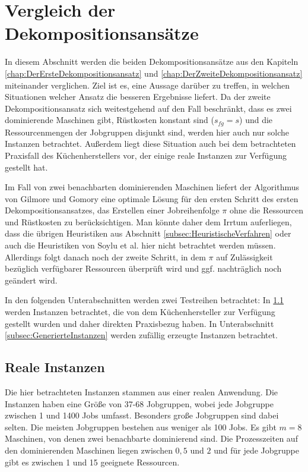 \documentclass{scrreprt}
\begin{document}
\section{Vergleich der Dekompositionsansätze}
\label{sec:VergleichDerDekompositionsansaetze} 
In diesem Abschnitt werden die beiden Dekompositionsansätze aus den Kapiteln \ref{chap:DerErsteDekompositionsansatz} und \ref{chap:DerZweiteDekompositionsansatz}
miteinander verglichen. Ziel ist es, eine Aussage darüber zu treffen, in welchen Situationen welcher Ansatz die besseren Ergebnisse liefert.
Da der zweite Dekompositionsansatz sich weitestgehend auf den Fall beschränkt, dass es zwei dominierende Maschinen gibt,
Rüstkosten konstant sind ($s_{fg}=s$) und die Ressourcenmengen der Jobgruppen disjunkt sind, werden hier auch nur solche Instanzen betrachtet.
Außerdem liegt diese Situation auch bei dem betrachteten Praxisfall des Küchenherstellers vor, der einige reale Instanzen zur Verfügung gestellt hat.

Im Fall von zwei benachbarten dominierenden Maschinen liefert der Algorithmus von Gilmore und Gomory eine optimale Lösung für den ersten Schritt des ersten
Dekompositionsansatzes, das Erstellen einer Jobreihenfolge $\pi$ ohne die Ressourcen und Rüstkosten zu berücksichtigen.
Man könnte daher dem Irrtum auferliegen, dass die übrigen Heuristiken aus Abschnitt \ref{subsec:HeuristischeVerfahren} oder auch die Heuristiken von Soylu et al. \cite{soylu}
hier nicht betrachtet werden müssen. Allerdings folgt danach noch der zweite Schritt, in dem $\pi$ auf Zulässigkeit bezüglich verfügbarer Ressourcen überprüft wird
und ggf. nachträglich noch geändert wird.

In den folgenden Unterabschnitten werden zwei Testreihen betrachtet: In \ref{subsec:RealeInstanzen} werden Instanzen betrachtet, 
die von dem Küchenhersteller zur Verfügung gestellt wurden und daher direkten Praxisbezug haben.
In Unterabschnitt \ref{subsec:GenerierteInstanzen} werden zufällig erzeugte Instanzen betrachtet.

\subsection{Reale Instanzen}
\label{subsec:RealeInstanzen}
Die hier betrachteten Instanzen stammen aus einer realen Anwendung.
Die Instanzen haben eine Größe von 37-68 Jobgruppen, wobei jede Jobgruppe zwischen 1 und 1400 Jobs umfasst. Besonders große Jobgruppen sind dabei selten.
Die meisten Jobgruppen bestehen aus weniger als 100 Jobs.
Es gibt $m=8$ Maschinen, von denen zwei benachbarte dominierend sind.
Die Prozesszeiten auf den dominierenden Maschinen liegen zwischen $0{,}5$ und $2$ und für jede Jobgruppe gibt es zwischen 1 und 15 geeignete Ressourcen.
\end{document}
